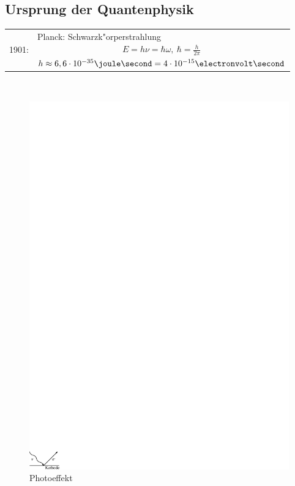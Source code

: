 \documentclass[a4paper]{scrartcl}
\begin{document}
\subsection{Ursprung der Quantenphysik}



\begin{tabular}{l p{400pt}}
1901:	& 
Planck: Schwarzk"orperstrahlung 
  \begin{align}
  E = h \nu = \hbar \omega, \  \hbar = \frac{h}{2 \pi}
  \end{align}
  $h \approx 6,6 \cdot 	10^{-35} \joule \second= 4 \cdot 10^{-15} \electronvolt \second$
\end{tabular}
\\

\begin{figure}[h]
\centering
\includegraphics{001Photoeffekt} 
\caption{Photoeffekt}
\label{Photoeffekt1}
\end{figure}
\end{document}
